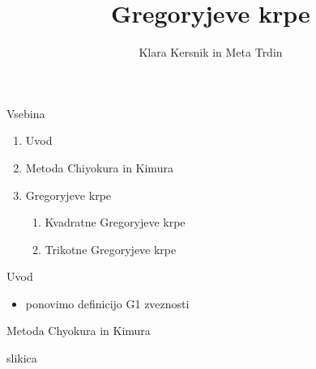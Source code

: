 \documentclass[a4paper,8pt]{beamer}
\title{Gregoryjeve krpe}
\author{Klara Kersnik in Meta Trdin} %
\institute[FMF]{Fakulteta za matematiko in fiziko}
\date{}
\begin{document}
\begin{frame}
\maketitle
\end{frame}

\begin{frame}{Vsebina}

\begin{enumerate}
	\item Uvod
	\item Metoda Chiyokura in Kimura
	\item Gregoryjeve krpe
	\begin{enumerate}
		\item Kvadratne Gregoryjeve krpe
		\item Trikotne Gregoryjeve krpe
	\end{enumerate}
\end{enumerate}

\end{frame}

\begin{frame}{Uvod}
\begin{itemize}
	\item ponovimo definicijo G1 zveznosti
\end{itemize}
\end{frame}


\begin{frame}{Metoda Chyokura in Kimura}
	
\end{frame}
\begin{frame}
	slikica
\end{frame}
\end{document}
